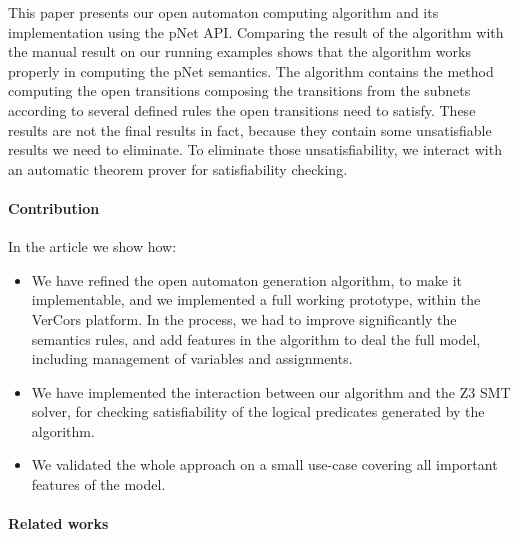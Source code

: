 \documentclass{lncs/llncs}
\newcommand{\TODO}[1]{\textcolor{red}{\textbf{[TODO:#1]}}}
\begin{document}
This paper presents our open automaton computing algorithm and its
implementation using the pNet API. Comparing the result of the algorithm with
the manual result on our running examples shows that the algorithm
works properly in computing the pNet semantics. The
algorithm contains the method computing the open transitions composing
the transitions from the subnets according to several defined rules
the open transitions need to satisfy. These results are not the final
results in fact, because they contain some unsatisfiable results we need
to eliminate. To eliminate those unsatisfiability, we interact with an
automatic theorem prover for satisfiability checking.

\paragraph{Contribution}
In the article we show how:
\begin{itemize}
\item We have refined the open automaton generation algorithm, to make
  it implementable, and we implemented a full working prototype, within the
  VerCors platform. In the process, we had to improve significantly the
  semantics rules, and add features in the algorithm to deal the full
  model, including management of variables and assignments.
\item We have implemented the interaction between our algorithm and the Z3
    SMT solver, for checking satisfiability of the logical predicates
    generated by the algorithm.
\item We validated the whole approach on a small use-case covering all
      important features of the model.
\end{itemize}





\paragraph{Related works}

\end{document}
